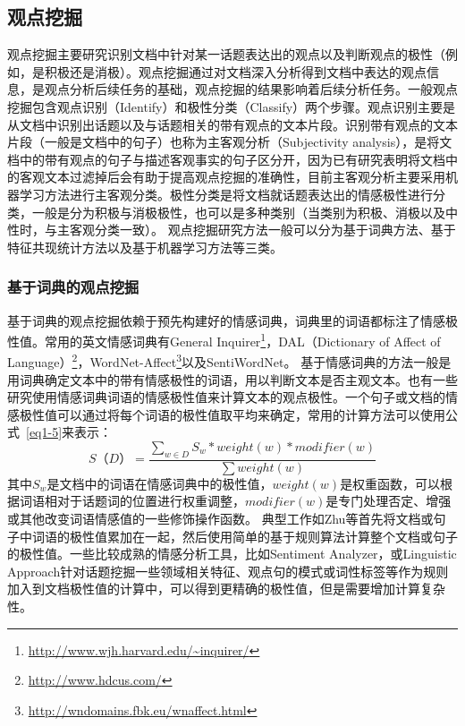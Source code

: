\subsection{观点挖掘}
\label{ch_mining}
观点挖掘主要研究识别文档中针对某一话题表达出的观点以及判断观点的极性（例如，是积极还是消极）。观点挖掘通过对文档深入分析得到文档中表达的观点信息，是观点分析后续任务的基础，观点挖掘的结果影响着后续分析任务。一般观点挖掘包含观点识别（Identify）和极性分类（Classify）两个步骤。观点识别主要是从文档中识别出话题以及与话题相关的带有观点的文本片段。识别带有观点的文本片段（一般是文档中的句子）也称为主客观分析（Subjectivity analysis），是将文档中的带有观点的句子与描述客观事实的句子区分开，因为已有研究表明将文档中的客观文本过滤掉后会有助于提高观点挖掘的准确性，目前主客观分析主要采用机器学习方法进行主客观分类。极性分类是将文档就话题表达出的情感极性进行分类，一般是分为积极与消极极性，也可以是多种类别（当类别为积极、消极以及中性时，与主客观分类一致）。
观点挖掘研究方法一般可以分为基于词典方法、基于特征共现统计方法以及基于机器学习方法等三类。

\subsubsection{基于词典的观点挖掘}
基于词典的观点挖掘依赖于预先构建好的情感词典，词典里的词语都标注了情感极性值。常用的英文情感词典有General Inquirer\footnote{\url{http://www.wjh.harvard.edu/~inquirer/}}，DAL（Dictionary of Affect of Language）\footnote{\url{http://www.hdcus.com/}}，WordNet-Affect\footnote{\url{http://wndomains.fbk.eu/wnaffect.html}}以及SentiWordNet。
基于情感词典的方法一般是用词典确定文本中的带有情感极性的词语，用以判断文本是否主观文本。也有一些研究使用情感词典词语的情感极性值来计算文本的观点极性。一个句子或文档的情感极性值可以通过将每个词语的极性值取平均来确定，常用的计算方法可以使用公式~\ref{eq1-5}来表示：
\begin{equation}
\label{eq1-5}
S（D）=\dfrac{\sum_{w \in D}S_w \ast weight(w) \ast modifier(w)}{\sum weight(w)}
\end{equation}
其中$ S_w $是文档中的词语在情感词典中的极性值，$ weight(w) $是权重函数，可以根据词语相对于话题词的位置进行权重调整，$ modifier(w) $是专门处理否定、增强或其他改变词语情感值的一些修饰操作函数。
典型工作如Zhu等首先将文档或句子中词语的极性值累加在一起，然后使用简单的基于规则算法计算整个文档或句子的极性值。一些比较成熟的情感分析工具，比如Sentiment Analyzer，或Linguistic Approach针对话题挖掘一些领域相关特征、观点句的模式或词性标签等作为规则加入到文档极性值的计算中，可以得到更精确的极性值，但是需要增加计算复杂性。

